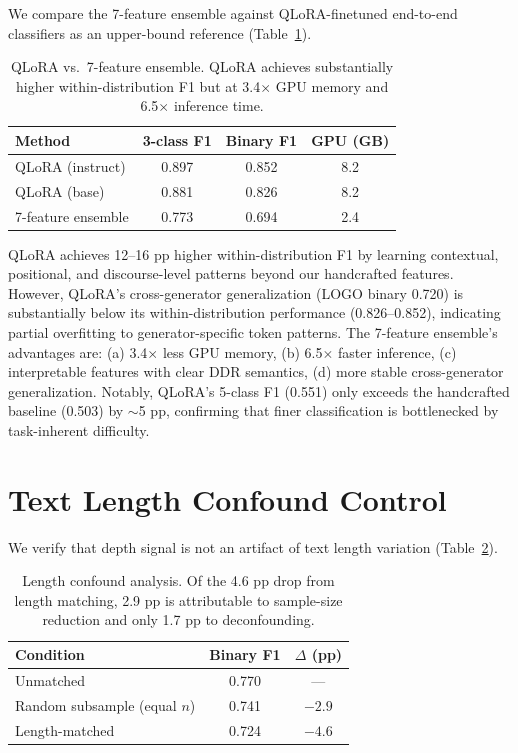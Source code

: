 \documentclass[11pt,twocolumn]{article}
\begin{document}
We compare the 7-feature ensemble against QLoRA-finetuned end-to-end classifiers as an upper-bound reference (Table~\ref{tab:qlora}).

\begin{table}[h]
\centering
\small
\begin{tabular}{lccc}
\toprule
\textbf{Method} & \textbf{3-class F1} & \textbf{Binary F1} & \textbf{GPU (GB)} \\
\midrule
QLoRA (instruct) & 0.897 & 0.852 & 8.2 \\
QLoRA (base) & 0.881 & 0.826 & 8.2 \\
7-feature ensemble & 0.773 & 0.694 & 2.4 \\
\bottomrule
\end{tabular}
\caption{QLoRA vs.\ 7-feature ensemble. QLoRA achieves substantially higher within-distribution F1 but at 3.4$\times$ GPU memory and 6.5$\times$ inference time.}
\label{tab:qlora}
\end{table}

QLoRA achieves 12--16 pp higher within-distribution F1 by learning contextual, positional, and discourse-level patterns beyond our handcrafted features.
However, QLoRA's cross-generator generalization (LOGO binary 0.720) is substantially below its within-distribution performance (0.826--0.852), indicating partial overfitting to generator-specific token patterns.
The 7-feature ensemble's advantages are: (a) 3.4$\times$ less GPU memory, (b) 6.5$\times$ faster inference, (c) interpretable features with clear DDR semantics, (d) more stable cross-generator generalization.
Notably, QLoRA's 5-class F1 (0.551) only exceeds the handcrafted baseline (0.503) by $\sim$5 pp, confirming that finer classification is bottlenecked by task-inherent difficulty.


\section{Text Length Confound Control}
\label{sec:length}

We verify that depth signal is not an artifact of text length variation (Table~\ref{tab:length}).

\begin{table}[h]
\centering
\small
\begin{tabular}{lcc}
\toprule
\textbf{Condition} & \textbf{Binary F1} & \textbf{$\Delta$ (pp)} \\
\midrule
Unmatched & 0.770 & --- \\
Random subsample (equal $n$) & 0.741 & $-2.9$ \\
Length-matched & 0.724 & $-4.6$ \\
\bottomrule
\end{tabular}
\caption{Length confound analysis. Of the 4.6 pp drop from length matching, 2.9 pp is attributable to sample-size reduction and only 1.7 pp to deconfounding.}
\label{tab:length}
\end{table}
\end{document}
